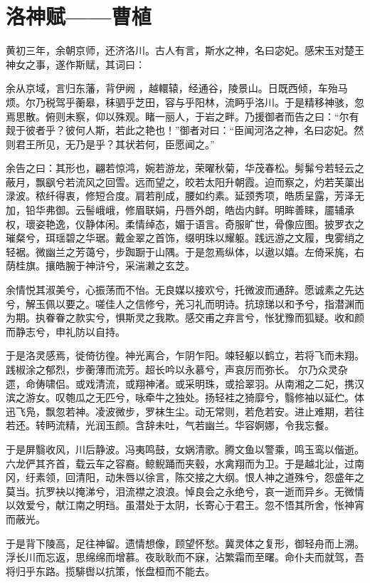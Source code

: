 \section{ 洛神赋——曹植}

黄初三年，余朝京师，还济洛川。古人有言，斯水之神，名曰宓妃。感宋玉对楚王神女之事，遂作斯赋，其词曰：

余从京域，言归东藩，背伊阙 ，越轘辕，经通谷，陵景山。日既西倾，车殆马烦。尔乃税驾乎蘅皋，秣驷乎芝田，容与乎阳林，流眄乎洛川。于是精移神骇，忽焉思散。俯则未察，仰以殊观。睹一丽人，于岩之畔。乃援御者而告之曰：“尔有觌于彼者乎？彼何人斯，若此之艳也！”御者对曰：“臣闻河洛之神，名曰宓妃。然则君王所见，无乃是乎？其状若何，臣愿闻之。”

余告之曰：其形也，翩若惊鸿，婉若游龙，荣曜秋菊，华茂春松。髣髴兮若轻云之蔽月，飘飖兮若流风之回雪。远而望之，皎若太阳升朝霞。迫而察之，灼若芙蕖出渌波。秾纤得衷，修短合度。肩若削成，腰如约素。延颈秀项，皓质呈露，芳泽无加，铅华弗御。云髻峨峨，修眉联娟，丹唇外朗，皓齿内鲜。明眸善睐，靥辅承权，瓌姿艳逸，仪静体闲。柔情绰态，媚于语言。奇服旷世，骨像应图。披罗衣之璀粲兮，珥瑶碧之华琚。戴金翠之首饰，缀明珠以耀躯。践远游之文履，曳雾绡之轻裾。微幽兰之芳蔼兮，步踟蹰于山隅。于是忽焉纵体，以遨以嬉。左倚采旄，右荫桂旗。攘皓腕于神浒兮，采湍濑之玄芝。

余情悦其淑美兮，心振荡而不怡。无良媒以接欢兮，托微波而通辞。愿诚素之先达兮，解玉佩以要之。嗟佳人之信修兮，羌习礼而明诗。抗琼珶以和予兮，指潜渊而为期。执眷眷之款实兮，惧斯灵之我欺。感交甫之弃言兮，怅犹豫而狐疑。收和颜而静志兮，申礼防以自持。

于是洛灵感焉，徙倚彷徨。神光离合，乍阴乍阳。竦轻躯以鹤立，若将飞而未翔。践椒涂之郁烈，步蘅薄而流芳。超长吟以永慕兮，声哀厉而弥长。 尔乃众灵杂遝，命俦啸侣。或戏清流，或翔神渚。或采明珠，或拾翠羽。从南湘之二妃，携汉滨之游女。叹匏瓜之无匹兮，咏牵牛之独处。扬轻袿之猗靡兮，翳修袖以延伫。体迅飞凫，飘忽若神。凌波微步，罗袜生尘。动无常则，若危若安。进止难期，若往若还。转眄流精，光润玉颜。含辞未吐，气若幽兰。华容婀娜，令我忘餐。

于是屏翳收风，川后静波。冯夷鸣鼓，女娲清歌。腾文鱼以警乘，鸣玉鸾以偕逝。六龙俨其齐首，载云车之容裔。鲸鲵踊而夹毂，水禽翔而为卫。于是越北沚，过南冈，纡素领，回清阳，动朱唇以徐言，陈交接之大纲。恨人神之道殊兮，怨盛年之莫当。抗罗袂以掩涕兮，泪流襟之浪浪。悼良会之永绝兮，哀一逝而异乡。无微情以效爱兮，献江南之明珰。虽潜处于太阴，长寄心于君王。忽不悟其所舍，怅神宵而蔽光。

于是背下陵高，足往神留。遗情想像，顾望怀愁。冀灵体之复形，御轻舟而上溯。浮长川而忘返，思绵绵而增慕。夜耿耿而不寐，沾繁霜而至曙。命仆夫而就驾，吾将归乎东路。揽騑辔以抗策，怅盘桓而不能去。
